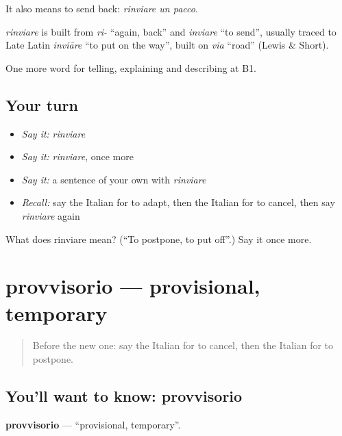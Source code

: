 It also means to send back: \emph{rinviare un pacco}.

\begin{cousinweb}
\emph{rinviare} is built from \emph{ri-} \textquotedblleft{}again, back\textquotedblright{} and \emph{inviare} \textquotedblleft{}to send\textquotedblright{}, usually traced to Late Latin \emph{inviāre} \textquotedblleft{}to put on the way\textquotedblright{}, built on \emph{via} \textquotedblleft{}road\textquotedblright{} (Lewis \& Short).
\end{cousinweb}

\begin{grammarlens}[title={What you've built}]
One more word for telling, explaining and describing at B1.
\end{grammarlens}

\subsection*{Your turn}
\begin{itemize}
\raggedright
  \item \emph{Say it:} \emph{rinviare}
  \item \emph{Say it:} \emph{rinviare}, once more
  \item \emph{Say it:} a sentence of your own with \emph{rinviare}
  \item \emph{Recall:} say the Italian for to adapt, then the Italian for to cancel, then say \emph{rinviare} again
\end{itemize}

\begin{tcolorbox}[breakable,colback=teal!4,colframe=teal!35!black,title={Before you move on}]
What does rinviare mean? (\textquotedblleft{}To postpone, to put off\textquotedblright{}.) Say it once more.
\end{tcolorbox}
\section[provvisorio]{provvisorio — provisional, temporary}

\label{lesson:IT-C375-provvisorio}



\begin{quote}
Before the new one: say the Italian for to cancel, then the Italian for to postpone.
\end{quote}

\subsection*{You'll want to know: provvisorio}
\textbf{provvisorio} — \textquotedblleft{}provisional, temporary\textquotedblright{}.

